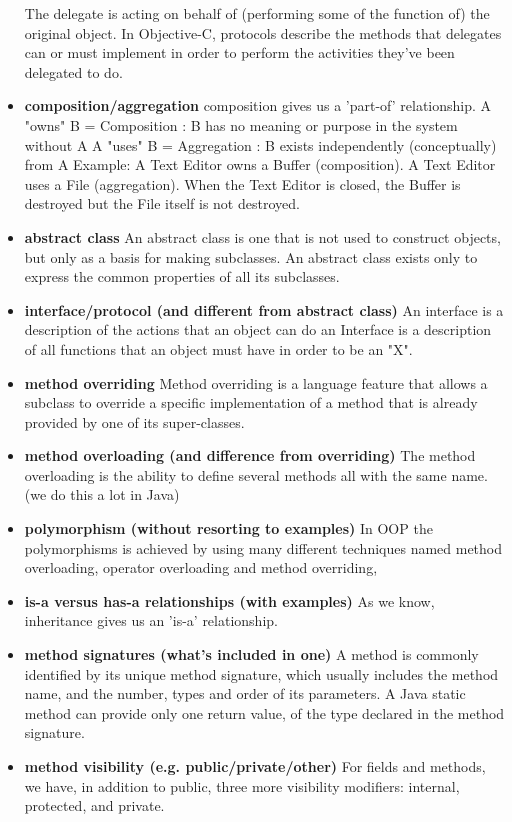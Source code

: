 \documentclass[letterpaper]{article}
\begin{document}
\begin{itemize}
	The delegate is acting on behalf of (performing some of the function of) 
	the original object.  In Objective-C, protocols describe the methods that 
	delegates can or must implement in order to perform the activities they've 
	been delegated to do. 

\item {\bf composition/aggregation
}	composition gives us a 'part-of' relationship.
	A "owns" B = Composition : B has no meaning or purpose in the system without A
	A "uses" B = Aggregation : B exists independently (conceptually) from A
	Example: A Text Editor owns a Buffer (composition). A Text Editor uses a File (aggregation). When the Text Editor is closed, the Buffer is destroyed but the File itself is not destroyed.

		
\item {\bf abstract class
}	An abstract class is one that is not used to construct objects, but only as a basis for making subclasses. An abstract class exists only to express the common properties of all its subclasses. 

\item {\bf interface/protocol (and different from abstract class)
}	An interface is a description of the actions that an object can do
	an Interface is a description of all functions that an object must have in order to be an "X".

\item {\bf method overriding
}	Method overriding is a language feature that allows a subclass to override a specific implementation of a method that is already provided by one of its super-classes. 
\item {\bf 
method overloading (and difference from overriding)
}	The method overloading is the ability to define several methods all with the same name. 
	(we do this a lot in Java)
\item {\bf 
polymorphism (without resorting to examples)
}	In OOP the polymorphisms is achieved by using many different techniques 
	named method overloading, operator overloading and method overriding, 
\item {\bf 
is-a versus has-a relationships (with examples)
}	As we know, inheritance gives us an 'is-a' relationship.
\item {\bf 
method signatures (what's included in one)}
	A method is commonly identified by its unique method signature, which usually includes the method name, and the number, types and order of its parameters.
	A Java static method can provide only one return value, of the type declared in the method signature. 
\item {\bf 
method visibility (e.g. public/private/other)}
	For fields and methods, we have, in addition to public, three more visibility modifiers: internal, protected, and private.

\end{itemize}
\end{document}
